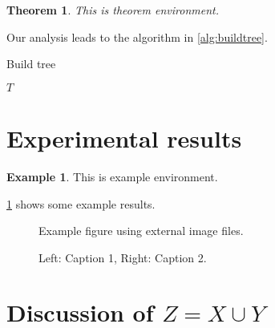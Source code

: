 \documentclass[10pt,reqno,final]{article}
\numberwithin{equation}{section}
\numberwithin{figure}{section}
\numberwithin{table}{section}
\theoremstyle{plain}
\newtheorem{theorem}{Theorem}[section]
\theoremstyle{definition}
\newtheorem{example}{Example}
\theoremstyle{remark}
\begin{document}
\begin{theorem}
  This is theorem environment.
\end{theorem}


Our analysis leads to the algorithm in \ref{alg:buildtree}.

\begin{algorithm}
\caption{Build tree}
\label{alg:buildtree}
\begin{algorithmic}
\ENDWHILE
\RETURN $T$
\end{algorithmic}
\end{algorithm}

\lipsum[41]

\section{Experimental results}
\label{sec:experiments}

\lipsum[45]

\begin{example}
  This is example environment.
\end{example}

\ref{fig:testfig} shows some example results.

\begin{figure}[htbp]
  \centering
  \label{fig:a}
  \caption{Example figure using external image files.}
  \label{fig:testfig}
\end{figure}

\lipsum[48]

\begin{figure}[htb]
  \centering
  \hfill
  \caption{Left: Caption 1, Right: Caption 2.}
  \label{fig:testfig12}
\end{figure}


\section{Discussion of \texorpdfstring{{\boldmath$Z=X \cup Y$}}{Z = X union Y}}
\end{document}
